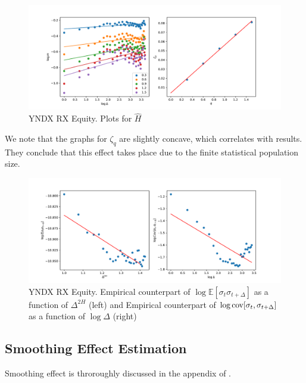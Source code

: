         \begin{figure}[htbp]
            \includegraphics[width=\textwidth]{fig/YNDX RX Equity Hurst Est.pdf}
            \caption{YNDX RX Equity. Plots for $\hat{H}$}
            \label{fig:logMDelta}
        \end{figure}

        We note that the graphs for $\zeta_q$ are slightly concave, which correlates with \cite{GatheralRosenbaum2014} results.
        They conclude that this effect takes place due to the finite statistical population size.

        \begin{figure}
            \includegraphics[width=\textwidth]{fig/YNDX RX Equity logE vs logD.pdf}
            \caption{YNDX RX Equity. Empirical counterpart of $\log\mathbb{E} \left[\sigma_{t}\sigma_{t+\Delta}\right]$ as a function of $\Delta^{2H}$ (left) and Empirical counterpart of $\log\operatorname*{cov} [\sigma_{t}, \sigma_{t+\Delta}]$ as a function of $\log\Delta$ (right)}
        \end{figure}

    \subsection{Smoothing Effect Estimation}
        Smoothing effect is throroughly discussed in the appendix of \cite{GatheralRosenbaum2014}.

